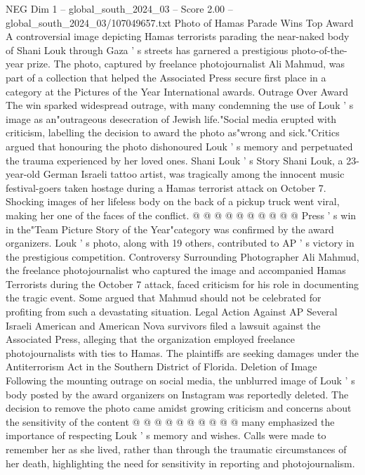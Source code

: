 \begin{textsample}{NEG Dim 1 – global\_south\_2024\_03 – Score 2.00 – global\_south\_2024\_03/107049657.txt}  \label{ex:f1_neg_438}
Photo of Hamas Parade Wins Top Award A controversial image depicting Hamas terrorists parading the near-naked body of Shani Louk through Gaza ' s streets has garnered a prestigious photo-of-the-year prize.
The photo, captured by freelance photojournalist Ali Mahmud, was part of a collection that helped the Associated Press secure first place in a category at the Pictures of the Year International awards.
Outrage Over Award The win sparked widespread outrage, with many condemning the use of Louk ' s image as an"outrageous desecration of Jewish life."Social media erupted with criticism, labelling the decision to award the photo as"wrong and sick."Critics argued that honouring the photo dishonoured Louk ' s memory and perpetuated the trauma experienced by her loved ones.
Shani Louk ' s Story Shani Louk, a 23-year-old German Israeli tattoo artist, was tragically among the innocent music festival-goers taken hostage during a Hamas terrorist attack on October 7.
Shocking images of her lifeless body on the back of a pickup truck went viral, making her one of the faces of the conflict. @ @ @ @ @ @ @ @ @ @ Press ' s win in the"Team Picture Story of the Year"category was confirmed by the award organizers.
Louk ' s photo, along with 19 others, contributed to AP ' s victory in the prestigious competition.
Controversy Surrounding Photographer Ali Mahmud, the freelance photojournalist who captured the image and accompanied Hamas Terrorists during the October 7 attack, faced criticism for his role in documenting the tragic event.
Some argued that Mahmud should not be celebrated for profiting from such a devastating situation.
Legal Action Against AP Several Israeli American and American Nova survivors filed a lawsuit against the Associated Press, alleging that the organization employed freelance photojournalists with ties to Hamas.
The plaintiffs are seeking damages under the Antiterrorism Act in the Southern District of Florida.
Deletion of Image Following the mounting outrage on social media, the unblurred image of Louk ' s body posted by the award organizers on Instagram was reportedly deleted.
The decision to remove the photo came amidst growing criticism and concerns about the sensitivity of the content @ @ @ @ @ @ @ @ @ @ many emphasized the importance of respecting Louk ' s memory and wishes.
Calls were made to remember her as she lived, rather than through the traumatic circumstances of her death, highlighting the need for sensitivity in reporting and photojournalism.

\end{textsample}
